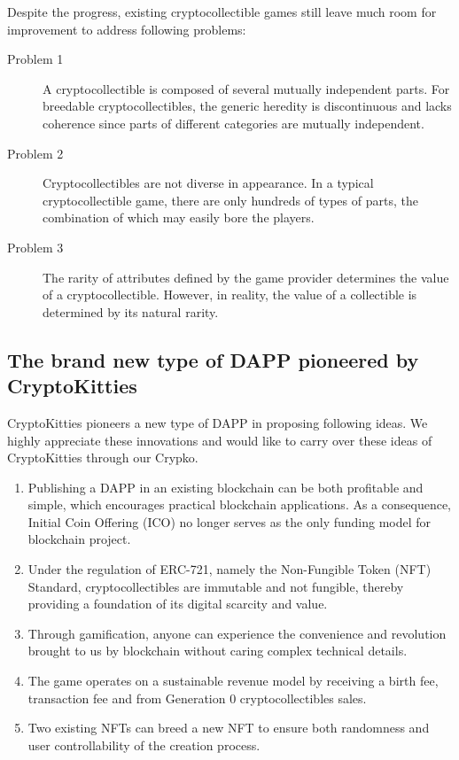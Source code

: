\documentclass[a4paper]{article}
\begin{document}
Despite the progress, existing cryptocollectible games still leave much room for improvement to address following problems:

\begin{description}
\item [Problem 1\label{problem:1}] A cryptocollectible is composed of several mutually independent parts. For breedable cryptocollectibles, the generic heredity is discontinuous and lacks coherence since parts of different categories are mutually independent.
\item [Problem 2\label{problem:2}] Cryptocollectibles are not diverse in appearance. In a typical cryptocollectible game, there are only hundreds of types of parts, the combination of which may easily bore the players.
\item [Problem 3\label{problem:3}] The rarity of attributes defined by the game provider determines the value of a cryptocollectible. However, in reality, the value of a collectible is determined by its natural rarity.
\end{description}

\subsection{The brand new type of DAPP pioneered by CryptoKitties}

CryptoKitties pioneers a new type of DAPP in proposing following ideas. 
We highly appreciate these innovations and would like to carry over these ideas of CryptoKitties through our Crypko.

\begin{enumerate}
\item Publishing a DAPP in an existing blockchain can be both profitable and simple, which encourages practical blockchain applications. As a consequence, Initial Coin Offering (ICO) no longer serves as the only funding model for blockchain project.
\item Under the regulation of ERC-721, namely the Non-Fungible Token (NFT) Standard, cryptocollectibles are immutable and not fungible, thereby providing a foundation of its digital scarcity and value.
\item Through gamification, anyone can experience the convenience and revolution brought to us by blockchain without caring complex technical details.
\item The game operates on a sustainable revenue model by receiving a birth fee, transaction fee and from Generation 0 cryptocollectibles sales.
\item Two existing NFTs can breed a new NFT to ensure both randomness and user controllability of the creation process.
\end{enumerate}
\end{document}
